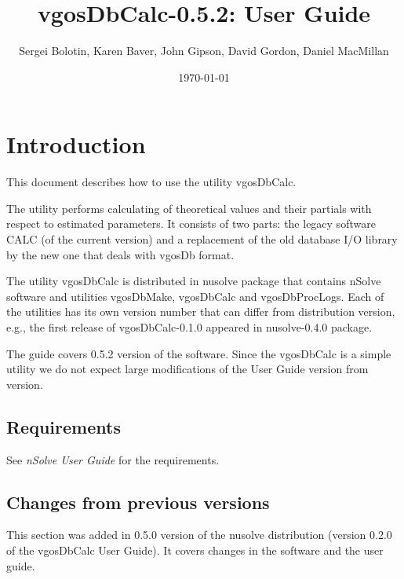 \documentclass [10pt,letterpaper]{report}
\newcommand{\nuSolve}{\greektext n\latintext Solve}
\newcommand{\thisVersion}{0.5.2}
\begin{document}
\title{vgosDbCalc-\thisVersion{}: User Guide}

\author{
Sergei Bolotin,
Karen Baver,
John Gipson,
David Gordon,
Daniel MacMillan
}

\date{\today}


\maketitle

\tableofcontents


\def\leftSp      {48mm}
\def\riteSp     {113mm}


\chapter{Introduction}
\label{intro}

This document describes how to use the utility vgosDbCalc.

The utility performs calculating of theoretical values and their partials
with respect to estimated parameters. It consists of two parts: the legacy
software CALC (of the current version) and a replacement of the old database
I/O library by the new one that deals with vgosDb format.

The utility vgosDbCalc is distributed in nusolve package that contains \nuSolve{}
software and utilities vgosDbMake, vgosDbCalc and vgosDbProcLogs. Each of the
utilities has its own version number that can differ from distribution version,
e.g., the first release of vgosDbCalc-0.1.0 appeared in nusolve-0.4.0 package.

The guide covers \thisVersion{} version of the software. Since the vgosDbCalc
is a simple utility we do not expect large modifications of the
User Guide version from version.



%
%
%
\section{Requirements}
\label{intro_reqs}

See \emph{\nuSolve{} User Guide} for the requirements.


%
%
%
\section{Changes from previous versions}
\label{intro_changes}

This section was added in 0.5.0 version of the nusolve distribution (version 0.2.0
of the vgosDbCalc User Guide). It covers changes in the software and the user guide.
\end{document}
